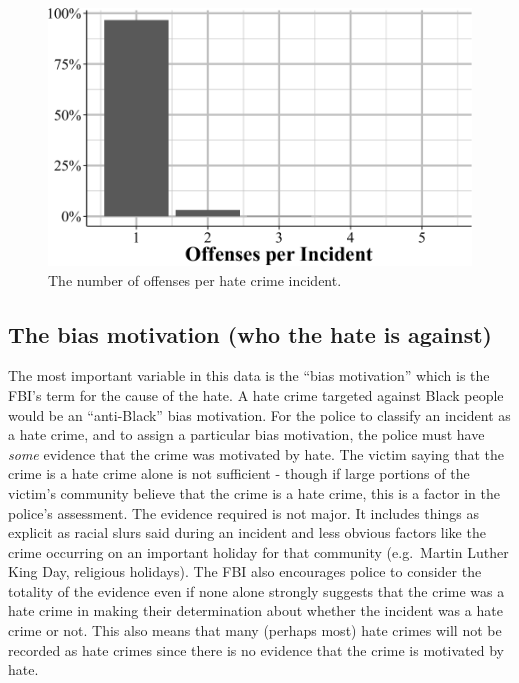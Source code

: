 \documentclass[
  12pt,
  openany]{book}
\begin{document}
\begin{figure}

{\centering \includegraphics[width=0.9\linewidth]{09_hate_crime_files/figure-latex/crimesPerHateCrime-1} 

}

\caption{The number of offenses per hate crime incident.}\label{fig:crimesPerHateCrime}
\end{figure}

\subsection{The bias motivation (who the hate is against)}\label{the-bias-motivation-who-the-hate-is-against}

The most important variable in this data is the ``bias motivation'' which is the FBI's term for the cause of the hate. A hate crime targeted against Black people would be an ``anti-Black'' bias motivation. For the police to classify an incident as a hate crime, and to assign a particular bias motivation, the police must have \emph{some} evidence that the crime was motivated by hate. The victim saying that the crime is a hate crime alone is not sufficient - though if large portions of the victim's community believe that the crime is a hate crime, this is a factor in the police's assessment. The evidence required is not major. It includes things as explicit as racial slurs said during an incident and less obvious factors like the crime occurring on an important holiday for that community (e.g.~Martin Luther King Day, religious holidays). The FBI also encourages police to consider the totality of the evidence even if none alone strongly suggests that the crime was a hate crime in making their determination about whether the incident was a hate crime or not. This also means that many (perhaps most) hate crimes will not be recorded as hate crimes since there is no evidence that the crime is motivated by hate.
\end{document}
